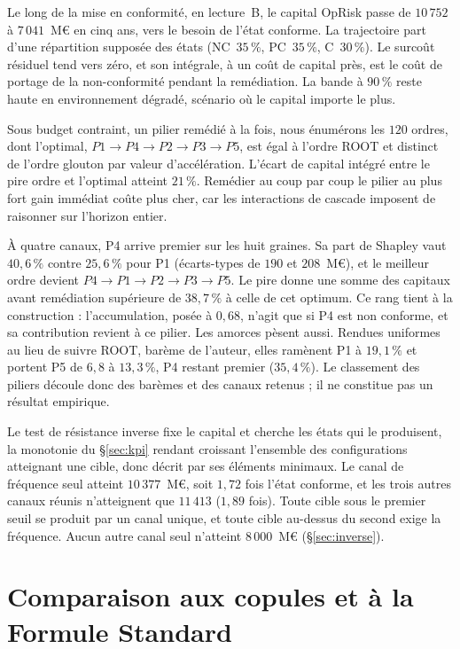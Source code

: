 Le long de la mise en conformité, en lecture~B, le capital OpRisk passe de $10\,752$ à $7\,041$~M\euro{}
en cinq ans, vers le besoin de l'état conforme. La trajectoire part d'une répartition supposée des
états (NC~$35\,\%$, PC~$35\,\%$, C~$30\,\%$). Le surcoût résiduel tend vers zéro, et son intégrale, à un coût de capital près, est le
coût de portage de la non-conformité pendant la remédiation. La bande à $90\,\%$ reste haute en
environnement dégradé, scénario où le capital importe le plus.

\label{sec:res-prio}%
Sous budget contraint, un pilier remédié à la fois, nous énumérons les $120$ ordres, dont
l'optimal, $P1\to P4\to P2\to P3\to P5$, est égal à l'ordre ROOT et distinct de l'ordre glouton par
valeur d'accélération. L'écart de capital intégré entre le pire ordre et l'optimal atteint
$21\,\%$. Remédier au coup par coup le pilier au plus fort gain immédiat coûte plus cher, car les
interactions de cascade imposent de raisonner sur l'horizon entier.

À quatre canaux, P4 arrive premier sur les huit graines. Sa part de Shapley vaut $40{,}6\,\%$ contre $25{,}6\,\%$ pour P1 (écarts-types de $190$ et $208$~M\euro), et
le meilleur ordre devient $P4\to P1\to P2\to P3\to P5$. Le pire donne une somme des capitaux avant
remédiation supérieure de $38{,}7\,\%$ à celle de cet optimum. Ce rang tient à la construction : l'accumulation, posée à $0{,}68$, n'agit que si P4 est non conforme,
et sa contribution revient à ce pilier. Les amorces pèsent aussi. Rendues uniformes au lieu de suivre ROOT, barème de
l'auteur, elles ramènent P1 à $19{,}1\,\%$ et portent P5 de $6{,}8$ à $13{,}3\,\%$, P4 restant premier ($35{,}4\,\%$).
Le classement des piliers découle donc des barèmes et des canaux retenus ; il ne constitue pas un résultat empirique.

Le test de résistance inverse fixe le capital et cherche les états qui le produisent, la monotonie
du \S\ref{sec:kpi} rendant croissant l'ensemble des configurations atteignant une cible, donc décrit
par ses éléments minimaux. Le canal de fréquence seul atteint $10\,377$~M\euro, soit $1{,}72$ fois
l'état conforme, et les trois autres canaux réunis n'atteignent que $11\,413$ ($1{,}89$ fois).
Toute cible sous le premier seuil se produit par un canal unique, et toute cible au-dessus du second
exige la fréquence. Aucun autre canal seul n'atteint $8\,000$~M\euro{} (\S\ref{sec:inverse}).

\section{Comparaison aux copules et à la Formule Standard}
\label{sec:benchmark}

